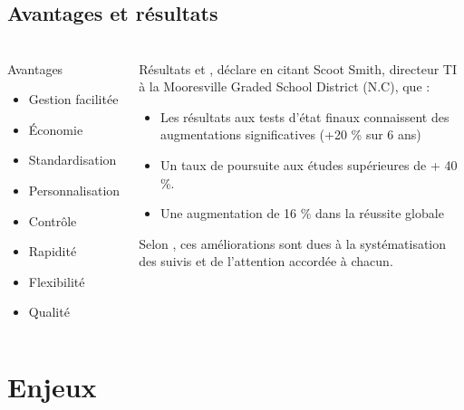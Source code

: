 \documentclass[aspectratio=169]{beamer}
\begin{document}
			
	\subsection{Avantages et résultats} 
		\begin{frame}
			\frametitle{}
			\begin{columns}[t]
					\begin{block}{Avantages \citep{Lamontagne2013}}
						\begin {itemize}
							\item Gestion facilitée
							\item Économie
							\item Standardisation
							\item Personnalisation
							\item Contrôle
							\item Rapidité
							\item Flexibilité
							\item Qualité
			\end{itemize}
					\end{block}
					\begin{block}{Résultats}
					\citet {Stansbury2013C} et \citet{Lamontagne2013}, déclare en citant Scoot Smith, directeur TI à la Mooresville Graded School District (N.C), que :
						\begin {itemize}
							\item Les résultats aux tests d'état finaux connaissent des augmentations significatives (+20 \% sur 6 ans)
							\item Un taux de poursuite aux études supérieures de + 40 \%.
							\item Une augmentation de 16 \% dans la réussite globale
						\end{itemize}
			Selon \citet{Lamontagne2013}, ces améliorations sont dues à la systématisation des suivis et de l'attention accordée à chacun.
			
	
					\end{block}
		\end{columns}
			
		\end{frame}
	
	
	
	\section{Enjeux}
			
\end{document}
